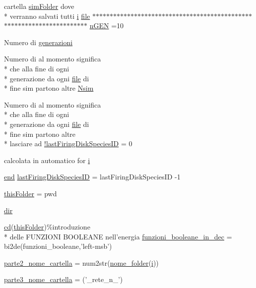 \begin{DoxyCompactItemize}
cartella \hyperlink{a00026_aa671e3345005bd599e662bcaa115b18a}{sim\-Folder} dove \\*
verranno salvati tutti \hyperlink{a00065_ad3efca1ea6e3333daf30719ee0501862}{i} \hyperlink{a00062_a4e8353d6c62cf54bf4a1a8f63e56b8c3}{file} $\ast$$\ast$$\ast$$\ast$$\ast$$\ast$$\ast$$\ast$$\ast$$\ast$$\ast$$\ast$$\ast$$\ast$$\ast$$\ast$$\ast$$\ast$$\ast$$\ast$$\ast$$\ast$$\ast$$\ast$$\ast$$\ast$$\ast$$\ast$$\ast$$\ast$$\ast$$\ast$$\ast$$\ast$$\ast$$\ast$$\ast$$\ast$$\ast$$\ast$$\ast$$\ast$$\ast$$\ast$$\ast$$\ast$$\ast$$\ast$$\ast$$\ast$$\ast$$\ast$$\ast$$\ast$$\ast$$\ast$$\ast$$\ast$$\ast$$\ast$$\ast$$\ast$$\ast$$\ast$$\ast$$\ast$$\ast$$\ast$$\ast$$\ast$ \hyperlink{a00065_a4c8fe523edbe179c5d215da13f469f72}{n\-G\-E\-N} =10
\item 
Numero di \hyperlink{a00065_a5951b3462407a0e7e2e60534f76f5fec}{generazioni}
\item 
Numero di al momento significa \\*
che alla fine di ogni \\*
generazione da ogni \hyperlink{a00062_a4e8353d6c62cf54bf4a1a8f63e56b8c3}{file} di \\*
fine sim partono altre \hyperlink{a00065_af882a6050e97fe1c6cc2bb391ea57479}{Nsim}
\item 
Numero di al momento significa \\*
che alla fine di ogni \\*
generazione da ogni \hyperlink{a00062_a4e8353d6c62cf54bf4a1a8f63e56b8c3}{file} di \\*
fine sim partono altre \\*
lasciare ad \hyperlink{a00065_aafb51343927e7262fbd66ce291fdbb87}{!last\-Firing\-Disk\-Species\-I\-D} = 0
\item 
calcolata in automatico for \hyperlink{a00065_ad3efca1ea6e3333daf30719ee0501862}{i}
\item 
\hyperlink{a00019_afb358f48b1646c750fb9da6c6585be2b}{end} \hyperlink{a00065_ac9358e0c7555a21532187de31cdbd469}{last\-Firing\-Disk\-Species\-I\-D} = last\-Firing\-Disk\-Species\-I\-D -\/1
\item 
\hyperlink{a00065_a2d4125646b62462ce279d82913125ccf}{this\-Folder} = pwd
\item 
\hyperlink{a00065_a4ca269cf93df1b512b52174c1a256fe5}{dir}
\item 
\hyperlink{a00065_abe327856a9ee2f30f3ccafe4dc9edf5e}{cd}(\hyperlink{a00065_a2d4125646b62462ce279d82913125ccf}{this\-Folder})\%introduzione \\*
delle F\-U\-N\-Z\-I\-O\-N\-I B\-O\-O\-L\-E\-A\-N\-E nell'energia \hyperlink{a00065_af44cf9f59bd0c10b4d2aa541bd7c156b}{funzioni\-\_\-booleane\-\_\-in\-\_\-dec} = bi2de(funzioni\-\_\-booleane,'left-\/msb')
\item 
\hyperlink{a00065_a18f9e9dff2c5a2fe455a8d41fa6860fa}{parte2\-\_\-nome\-\_\-cartella} = num2str(\hyperlink{a00065_a277bc625a7a558f74ccc1eb2963d70d0}{nome\-\_\-folder}(\hyperlink{a00065_ad3efca1ea6e3333daf30719ee0501862}{i}))
\item 
\hyperlink{a00065_a1795e2dc228962c5b67eaee336bba2ad}{parte3\-\_\-nome\-\_\-cartella} = ('\-\_\-rete\-\_\-n\-\_\-')
\end{DoxyCompactItemize}


